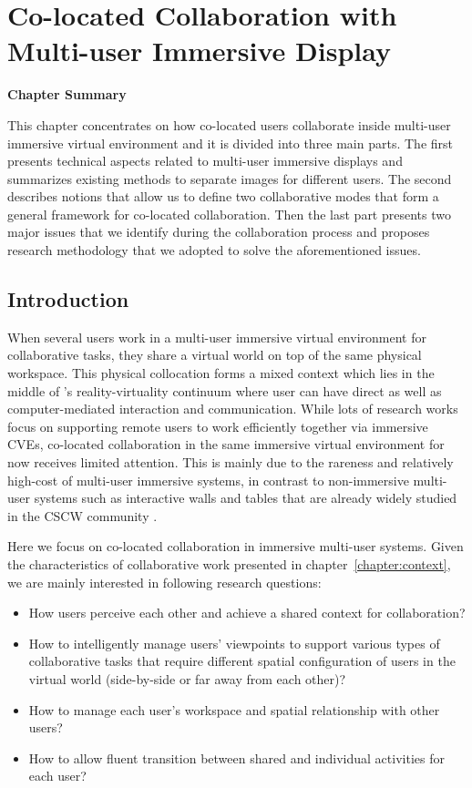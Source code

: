 \chapter{Co-located Collaboration with Multi-user Immersive Display}
\label{chapter:colocated_colab}
\pagebreak

\textbf{Chapter Summary}

This chapter concentrates on how co-located users collaborate inside multi-user immersive virtual environment and it is divided into three main parts. The first presents technical aspects related to multi-user immersive displays and summarizes existing methods to separate images for different users. The second describes notions that allow us to define two collaborative modes that form a general framework for co-located collaboration. Then the last part presents two major issues that we identify during the collaboration process and proposes research methodology that we adopted to solve the aforementioned issues.

\vspace*{2\baselineskip}

\minitoc

\newpage
\section{Introduction}
When several users work in a multi-user immersive virtual environment for collaborative tasks, they share a virtual world on top of the same physical workspace. This physical collocation forms a mixed context which lies in the middle of \citet{Milgram1995AR}'s reality-virtuality continuum where user can have direct as well as computer-mediated interaction and communication. While lots of research works focus on supporting remote users to work efficiently together via immersive CVEs, co-located collaboration in the same immersive virtual environment for now receives limited attention. This is mainly due to the rareness and relatively high-cost of multi-user immersive systems, in contrast to non-immersive multi-user systems such as interactive walls and tables that are already widely studied in the CSCW community \citep{Scott2003System, Inkpen2005Exploring}.

Here we focus on co-located collaboration in immersive multi-user systems. Given the characteristics of collaborative work presented in chapter~\ref{chapter:context}, we are mainly interested in following research questions:

\begin{itemize}
\item How users perceive each other and achieve a shared context for collaboration?
\item How to intelligently manage users' viewpoints to support various types of collaborative tasks that require different spatial configuration of users in the virtual world (side-by-side or far away from each other)?
\item How to manage each user's workspace and spatial relationship with other users?
\item How to allow fluent transition between shared and individual activities for each user?
\end{itemize}

